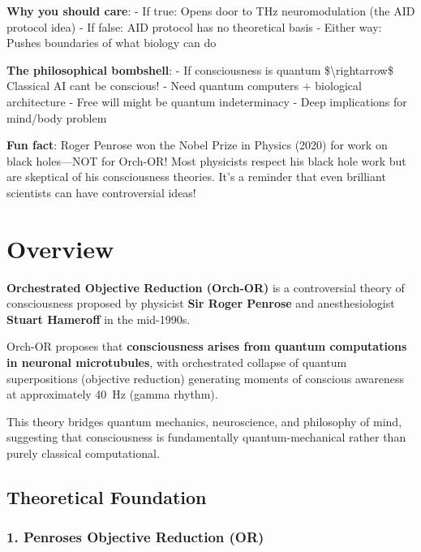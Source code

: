\begin{nontechnical}
\textbf{Why you should care}: - If true: Opens door to THz
neuromodulation (the AID protocol idea) - If false: AID protocol has no
theoretical basis - Either way: Pushes boundaries of what biology can do

\textbf{The philosophical bombshell}: - If consciousness is quantum
\$\textbackslash rightarrow\$ Classical AI can\textquotesingle t be
conscious! - Need quantum computers + biological architecture - Free
will might be quantum indeterminacy - Deep implications for mind/body
problem

\textbf{Fun fact}: Roger Penrose won the Nobel Prize in Physics (2020) for work on black holes---NOT for Orch-OR! Most physicists respect his black hole work but are skeptical of his consciousness theories. It's a reminder that even brilliant scientists can have controversial ideas!
\end{nontechnical}

\section{Overview}

\textbf{Orchestrated Objective Reduction (Orch-OR)} is a controversial theory of consciousness proposed by physicist \textbf{Sir Roger Penrose} and anesthesiologist \textbf{Stuart Hameroff} in the mid-1990s.

\begin{keyconcept}
Orch-OR proposes that \textbf{consciousness arises from quantum computations in neuronal microtubules}, with orchestrated collapse of quantum superpositions (objective reduction) generating moments of conscious awareness at approximately 40~Hz (gamma rhythm).
\end{keyconcept}

This theory bridges quantum mechanics, neuroscience, and philosophy of mind, suggesting that consciousness is fundamentally quantum-mechanical rather than purely classical computational.

\subsection{Theoretical Foundation}\label{theoretical-foundation}

\subsubsection{1. Penrose\textquotesingle s Objective Reduction
(OR)}\label{penroses-objective-reduction-or}

